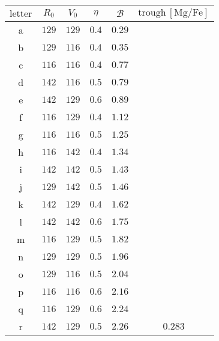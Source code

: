 \documentclass[twocolumn,linenumbers,trackchanges]{aastex631}
\newcommand{\MgFe}{\ensuremath{[\textrm{Mg}/\textrm{Fe}]}}
\begin{document}
\begin{table}[]
\centering
\begin{tabular}{cccccc}
$\textrm{letter}$ & $R_0$ & $V_0$ & $\eta$ & $\mathcal{B}$ & $\textrm{trough}\,\MgFe{}$ \\ \hline
a                 & $129$ & $129$ & $0.4$  & $0.29$        &                            \\
b                 & $129$ & $116$ & $0.4$  & $0.35$        &                            \\
c                 & $116$ & $116$ & $0.4$  & $0.77$        &                            \\
d                 & $142$ & $116$ & $0.5$  & $0.79$        &                            \\
e                 & $142$ & $129$ & $0.6$  & $0.89$        &                            \\
f                 & $116$ & $129$ & $0.4$  & $1.12$        &                            \\
g                 & $116$ & $116$ & $0.5$  & $1.25$        &                            \\
h                 & $116$ & $142$ & $0.4$  & $1.34$        &                            \\
i                 & $142$ & $142$ & $0.5$  & $1.43$        &                            \\
j                 & $129$ & $142$ & $0.5$  & $1.46$        &                            \\
k                 & $142$ & $129$ & $0.4$  & $1.62$        &                            \\
l                 & $142$ & $142$ & $0.6$  & $1.75$        &                            \\
m                 & $116$ & $129$ & $0.5$  & $1.82$        &                            \\
n                 & $129$ & $129$ & $0.5$  & $1.96$        &                            \\
o                 & $129$ & $116$ & $0.5$  & $2.04$        &                            \\
p                 & $116$ & $116$ & $0.6$  & $2.16$        &                            \\
q                 & $116$ & $129$ & $0.6$  & $2.24$        &                            \\ \hline
r                 & $142$ & $129$ & $0.5$  & $2.26$        & $0.283$                    \\

\end{tabular}
\end{table}
\end{document}
